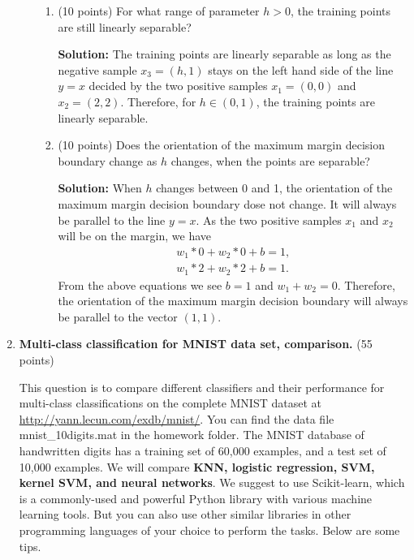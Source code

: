 \documentclass[twoside,10pt]{article}
\begin{document}
\begin{enumerate}
\begin{enumerate}
\begin{enumerate}
\item (10 points) For what range of parameter $h > 0$, the training points are still linearly separable?
\begin{tcolorbox}
\textbf{Solution:} The training points are linearly separable as long as the negative sample $x_3 = (h, 1)$ stays on the left hand side of the line $ y = x$ decided by the two positive samples $x_1 = (0,0)$ and $x_2 = (2,2)$. Therefore, for $h \in (0, 1)$, the training points are linearly separable.

\end{tcolorbox}

\item (10 points) Does the orientation of the maximum margin decision boundary change as $h$ changes, when the points are separable?
\begin{tcolorbox}
\textbf{Solution:} When $h$ changes between 0 and 1, the orientation of the maximum margin decision boundary dose not change. It will always be parallel to the line $ y = x$. As the two positive samples $x_1$ and $x_2$ will be on the margin, we have 
\begin{align*}
w_1 *0 + w_2 * 0 + b = 1, \\
w_1 * 2 + w_2 *2 + b = 1.
\end{align*} 
From the above equations we see $b=1$ and $w_1 + w_2 = 0.$ Therefore, the orientation of the maximum margin decision boundary will always be parallel to the vector $(1, 1)$.
\end{tcolorbox} 
\end{enumerate}


\end{enumerate}



\item {\bf Multi-class classification for MNIST data set, comparison.} (55 points)

This question is to compare different classifiers and their performance for multi-class classifications on the complete MNIST dataset at \url{http://yann.lecun.com/exdb/mnist/}. You can find the data file \textsf{mnist\_10digits.mat} in the homework folder. The MNIST database of handwritten digits has a training set of 60,000 examples, and a test set of 10,000 examples. We will compare {\bf KNN, logistic regression, SVM, kernel SVM, and  neural networks}. We suggest to use \textsf{Scikit-learn}, which is a commonly-used and powerful \textsf{Python} library with various machine learning tools. But you can also use other similar libraries in other programming languages of your choice to perform the tasks. Below are some tips. 


\end{enumerate}
\end{document}
